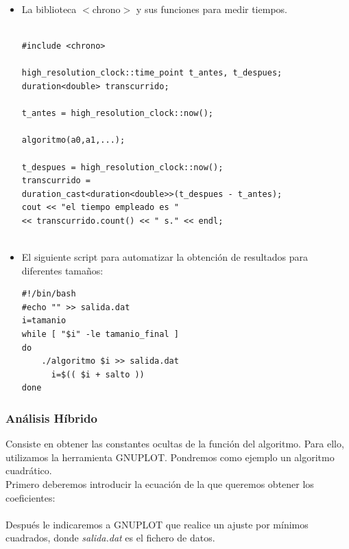 \documentclass[a4paper,12pt,twoside]{article} %
\begin{document}
\begin{itemize}
	\item La biblioteca $<$chrono$>$ y sus funciones para medir tiempos.
	
	\lstset{language=C++}
	\begin{lstlisting}

#include <chrono>
	
high_resolution_clock::time_point t_antes, t_despues;
duration<double> transcurrido;

t_antes = high_resolution_clock::now();

algoritmo(a0,a1,...);

t_despues = high_resolution_clock::now();
transcurrido = 
duration_cast<duration<double>>(t_despues - t_antes);
cout << "el tiempo empleado es " 
<< transcurrido.count() << " s." << endl;
	
	\end{lstlisting}
	
\vspace{1cm}

	\item El siguiente script para automatizar la obtención de resultados para diferentes tamaños:

	\lstset{language=Bash}
	\begin{lstlisting}
#!/bin/bash 
#echo "" >> salida.dat
i=tamanio
while [ "$i" -le tamanio_final ]
do
    ./algoritmo $i >> salida.dat
      i=$(( $i + salto ))
done

	\end{lstlisting}
	
\end{itemize}

\newpage
\subsubsection{Análisis Híbrido}

Consiste en obtener las constantes ocultas de la función del algoritmo. Para ello, utilizamos la herramienta GNUPLOT. Pondremos como ejemplo un algoritmo cuadrático.\\

Primero deberemos introducir la ecuación de la que queremos obtener los coeficientes:\\

\\

Después le indicaremos a GNUPLOT que realice un ajuste por mínimos cuadrados, donde \textit{salida.dat} es el fichero de datos.\\
\end{document}
